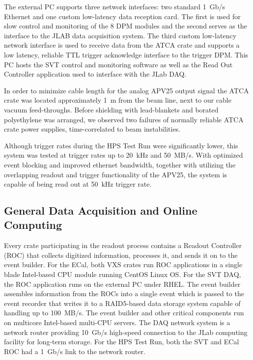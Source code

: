 \documentclass[final,3p,times,twocolumn]{elsarticle}
\begin{document}
The external PC supports three network interfaces: two standard 1~Gb/s Ethernet and one custom 
low-latency data reception card. The first is used for slow control and monitoring of the 8 
DPM modules and the second serves as the interface to the JLAB data acquisition system. The third 
custom low-latency network interface is used to receive data from the ATCA crate and supports a low 
latency, reliable TTL trigger acknowledge interface to the trigger DPM. This PC hosts the SVT control 
and monitoring software as well as the Read Out Controller application used to interface with the 
JLab DAQ.

In order to minimize cable length for the analog APV25 output signal the ATCA crate was located 
approximately 1~m from the beam line, next to our cable vacuum feed-throughs.   
Before shielding with lead-blankets and borated polyethylene was arranged, we observed two failures of normally reliable ATCA 
crate power supplies, time-correlated to beam instabilities. 

Although trigger rates during the HPS Test Run were significantly lower, this system was tested at 
trigger rates up to 20~kHz and 50~MB/s.  With optimized event blocking and improved ethernet 
bandwidth, together with utilizing the overlapping readout and trigger functionality of the APV25, the 
system is capable of being read out at 50~kHz trigger rate.


\subsection{General Data Acquisition and Online Computing}
\label{sec:daq}
Every crate participating in the readout process contains a Readout Controller (ROC) that 
collects digitized information, processes it, and sends it on to the event builder. For the ECal, both 
VXS crates run ROC applications in a single blade Intel-based CPU module running CentOS 
Linux OS. For the SVT DAQ, the ROC application runs on the external PC under RHEL. 
The event builder assembles information from the ROCs into a single event which is passed to the 
event recorder that writes it to a RAID5-based data storage system capable of handling up to 
100~MB/s. The event builder and other critical components run on multicore Intel-based multi-CPU 
servers. The DAQ network system is a network router providing 10~Gb/s high-speed connection 
to the JLab computing facility for long-term storage. For the HPS Test Run, both the SVT and ECal ROC had 
a 1~Gb/s link to the network router.
\end{document}
